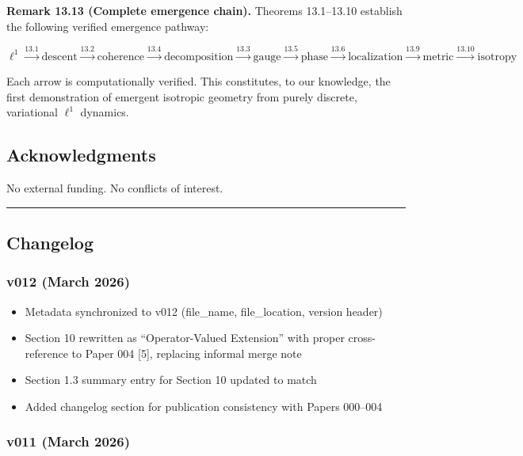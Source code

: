 \documentclass[
]{article}
\providecommand{\tightlist}{%
  \setlength{\itemsep}{0pt}\setlength{\parskip}{0pt}}
\begin{document}
\textbf{Remark 13.13 (Complete emergence chain).} Theorems 13.1--13.10
establish the following verified emergence pathway:

\[\ell^1 \xrightarrow{13.1} \text{descent} \xrightarrow{13.2} \text{coherence} \xrightarrow{13.4} \text{decomposition} \xrightarrow{13.3} \text{gauge} \xrightarrow{13.5} \text{phase} \xrightarrow{13.6} \text{localization} \xrightarrow{13.9} \text{metric} \xrightarrow{13.10} \text{isotropy}\]

Each arrow is computationally verified. This constitutes, to our
knowledge, the first demonstration of emergent isotropic geometry from
purely discrete, variational \(\ell^1\) dynamics.

\subsection{Acknowledgments}\label{acknowledgments}

No external funding. No conflicts of interest.

\begin{center}\rule{0.5\linewidth}{0.5pt}\end{center}

\subsection{Changelog}\label{changelog}

\subsubsection{v012 (March 2026)}\label{v012-march-2026}

\begin{itemize}
\tightlist
\item
  Metadata synchronized to v012 (file\_name, file\_location, version
  header)
\item
  Section 10 rewritten as ``Operator-Valued Extension'' with proper
  cross-reference to Paper 004 {[}5{]}, replacing informal merge note
\item
  Section 1.3 summary entry for Section 10 updated to match
\item
  Added changelog section for publication consistency with Papers
  000--004
\end{itemize}

\subsubsection{v011 (March 2026)}\label{v011-march-2026}
\end{document}
